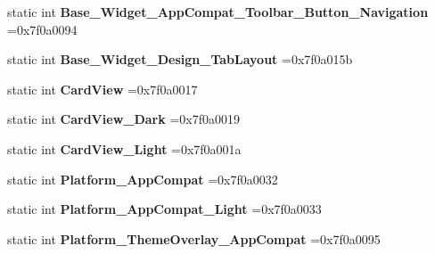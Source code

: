 \begin{DoxyCompactItemize}
\item 
\mbox{\label{classandroid_1_1support_1_1v7_1_1appcompat_1_1R_1_1style_af6466307d1f541d11441e12e1fc539c6}} 
static int {\bfseries Base\+\_\+\+Widget\+\_\+\+App\+Compat\+\_\+\+Toolbar\+\_\+\+Button\+\_\+\+Navigation} =0x7f0a0094
\item 
\mbox{\label{classandroid_1_1support_1_1v7_1_1appcompat_1_1R_1_1style_adbfa45cae1c1d5e1f41fde0e4db96bd9}} 
static int {\bfseries Base\+\_\+\+Widget\+\_\+\+Design\+\_\+\+Tab\+Layout} =0x7f0a015b
\item 
\mbox{\label{classandroid_1_1support_1_1v7_1_1appcompat_1_1R_1_1style_a8e98de418659d4af03e30d0a226ace70}} 
static int {\bfseries Card\+View} =0x7f0a0017
\item 
\mbox{\label{classandroid_1_1support_1_1v7_1_1appcompat_1_1R_1_1style_a16e6552abe6367873aab5ece551ecb0b}} 
static int {\bfseries Card\+View\+\_\+\+Dark} =0x7f0a0019
\item 
\mbox{\label{classandroid_1_1support_1_1v7_1_1appcompat_1_1R_1_1style_ac2d63549bb0201be223c2565a0a399c5}} 
static int {\bfseries Card\+View\+\_\+\+Light} =0x7f0a001a
\item 
\mbox{\label{classandroid_1_1support_1_1v7_1_1appcompat_1_1R_1_1style_a8eb0fca3574244f9e21b04dd61ebc9fa}} 
static int {\bfseries Platform\+\_\+\+App\+Compat} =0x7f0a0032
\item 
\mbox{\label{classandroid_1_1support_1_1v7_1_1appcompat_1_1R_1_1style_ad4fc86de1f37c3b74c3e5f97ab68ffcc}} 
static int {\bfseries Platform\+\_\+\+App\+Compat\+\_\+\+Light} =0x7f0a0033
\item 
\mbox{\label{classandroid_1_1support_1_1v7_1_1appcompat_1_1R_1_1style_aca4279ffba15599798dcd7b9188a39ab}} 
static int {\bfseries Platform\+\_\+\+Theme\+Overlay\+\_\+\+App\+Compat} =0x7f0a0095

\end{DoxyCompactItemize}
